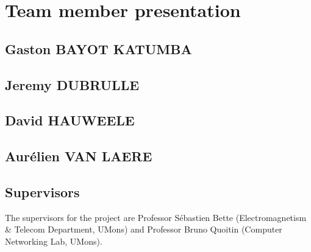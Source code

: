\documentclass[a4paper,10pt]{article}
\begin{document}
\section{Team member presentation}

\subsection{Gaston BAYOT KATUMBA}


\subsection{Jeremy DUBRULLE}


\subsection{David HAUWEELE}


\subsection{Aurélien VAN LAERE}


\subsection{Supervisors}

The supervisors for the project are Professor Sébastien Bette (Electromagnetism \& Telecom Department, UMons) and Professor Bruno Quoitin (Computer Networking Lab, UMons).

 
\end{document}
